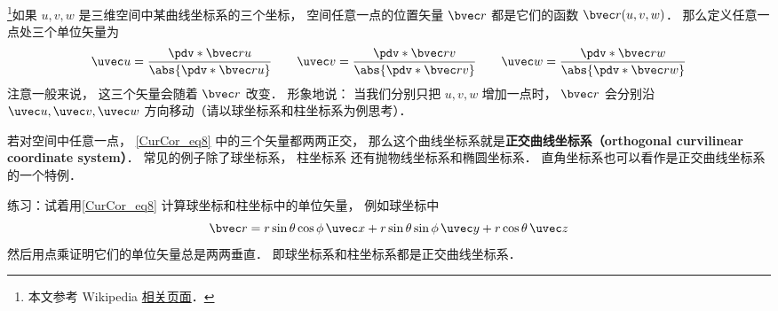 
\begin{issues}
\issueTODO
\end{issues}


\footnote{本文参考 Wikipedia \href{https://en.wikipedia.org/wiki/Curvilinear_coordinates}{相关页面}．}如果 $u, v, w$ 是三维空间中某曲线坐标系的三个坐标， 空间任意一点的位置矢量 $\bvec r$ 都是它们的函数 $\bvec r(u, v, w)$． 那么定义任意一点处三个单位矢量为
\begin{equation}\label{CurCor_eq8}
\uvec u = \frac{\pdv*{\bvec r}{u}}{\abs{\pdv*{\bvec r}{u}}}\qquad
\uvec v = \frac{\pdv*{\bvec r}{v}}{\abs{\pdv*{\bvec r}{v}}}\qquad
\uvec w = \frac{\pdv*{\bvec r}{w}}{\abs{\pdv*{\bvec r}{w}}}
\end{equation}
注意一般来说， 这三个矢量会随着 $\bvec r$ 改变． 形象地说： 当我们分别只把 $u, v, w$ 增加一点时， $\bvec r$ 会分别沿 $\uvec u, \uvec v, \uvec w$ 方向移动（请以球坐标系和柱坐标系为例思考）．

若对空间中任意一点， \autoref{CurCor_eq8} 中的三个矢量都两两正交， 那么这个曲线坐标系就是\textbf{正交曲线坐标系（orthogonal curvilinear coordinate system）}． 常见的例子除了球坐标系， 柱坐标系 还有抛物线坐标系和椭圆坐标系． 直角坐标系也可以看作是正交曲线坐标系的一个特例．

\begin{exercise}{}
练习：试着用\autoref{CurCor_eq8} 计算球坐标和柱坐标中的单位矢量， 例如球坐标中
\begin{equation}
\bvec r = r\sin\theta\cos\phi\,\uvec x + r\sin\theta\sin\phi\,\uvec y + r\cos\theta\,\uvec z
\end{equation}
然后用点乘证明它们的单位矢量总是两两垂直． 即球坐标系和柱坐标系都是正交曲线坐标系．
\end{exercise}

